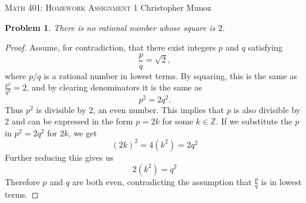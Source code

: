 \documentclass[12pt]{article}
\newtheorem{problem}{Problem}
\newcommand{\ZZ}{\ensuremath{\mathbb Z}}
\begin{document}
\small
\noindent \textsc{Math 401: Homework Assignment 1} \hfill Christopher Munoz

\noindent \hfill \normalsize
\bigskip

\setcounter{problem}{0} %


\begin{problem} %
There is no rational number whose square is $2$. \end{problem}


\begin{proof}
Assume, for contradiction, that there exist integers $p$ and $q$ satisfying
	$$\frac{p}{q} = \sqrt{2},$$
where $p/q$ is a rational number in lowest terms.  By squaring, this is the same as $\frac{p^2}{q^2} = 2$, and by clearing denominators it is the same as
	$$p^2 = 2 q^2.$$
	Thus $p^2$ is divisible by 2, an even number. This implies that $p$ is also divisible by 2 and can be expressed in the form $p = 2k$ for some $k \in \ZZ$. If we substitute the $p$ in $p^2 = 2q^2$ for $2k$, we get
	$$(2k)^2 = 4(k^2) = 2q^2$$
	Further reducing this gives us
	$$2(k^2) = q^2$$
	Therefore $p$ and $q$ are both even, contradicting the assumption that $\frac{p}{q}$ is in lowest terms.

\end{proof}
\end{document}
